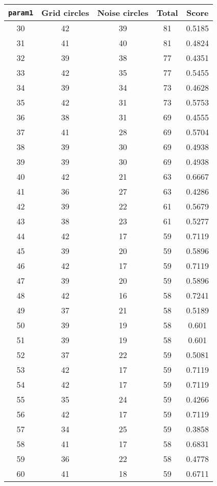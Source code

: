\documentclass[letterpaper, 12pt]{article}
\begin{document}
\begin{longtable}{|c|c|c|c|c|}
\hline
\textbf{\texttt{param1}} & \textbf{Grid circles} & \textbf{Noise circles} & \textbf{Total} & \textbf{Score} \\
\hline
30 & 42 & 39 & 81 & 0.5185 \\
\hline
31 & 41 & 40 & 81 & 0.4824 \\
\hline
32 & 39 & 38 & 77 & 0.4351 \\
\hline
33 & 42 & 35 & 77 & 0.5455 \\
\hline
34 & 39 & 34 & 73 & 0.4628 \\
\hline
35 & 42 & 31 & 73 & 0.5753 \\
\hline
36 & 38 & 31 & 69 & 0.4555 \\
\hline
37 & 41 & 28 & 69 & 0.5704 \\
\hline
38 & 39 & 30 & 69 & 0.4938 \\
\hline
39 & 39 & 30 & 69 & 0.4938 \\
\hline
40 & 42 & 21 & 63 & 0.6667 \\
\hline
41 & 36 & 27 & 63 & 0.4286 \\
\hline
42 & 39 & 22 & 61 & 0.5679 \\
\hline
43 & 38 & 23 & 61 & 0.5277 \\
\hline
44 & 42 & 17 & 59 & 0.7119 \\
\hline
45 & 39 & 20 & 59 & 0.5896 \\
\hline
46 & 42 & 17 & 59 & 0.7119 \\
\hline
47 & 39 & 20 & 59 & 0.5896 \\
\hline
48 & 42 & 16 & 58 & 0.7241 \\
\hline
49 & 37 & 21 & 58 & 0.5189 \\
\hline
50 & 39 & 19 & 58 & 0.601 \\
\hline
51 & 39 & 19 & 58 & 0.601 \\
\hline
52 & 37 & 22 & 59 & 0.5081 \\
\hline
53 & 42 & 17 & 59 & 0.7119 \\
\hline
54 & 42 & 17 & 59 & 0.7119 \\
\hline
55 & 35 & 24 & 59 & 0.4266 \\
\hline
56 & 42 & 17 & 59 & 0.7119 \\
\hline
57 & 34 & 25 & 59 & 0.3858 \\
\hline
58 & 41 & 17 & 58 & 0.6831 \\
\hline
59 & 36 & 22 & 58 & 0.4778 \\
\hline
60 & 41 & 18 & 59 & 0.6711 \\

\end{longtable}
\end{document}
